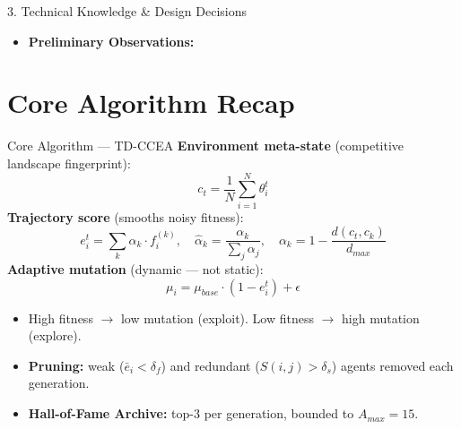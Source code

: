 \documentclass[aspectratio=169, 11pt]{beamer}
\begin{document}
\begin{frame}{3. Technical Knowledge \& Design Decisions}
\begin{itemize}
        \item \textbf{Preliminary Observations:} %
    \end{itemize}
\end{frame}






































\section{Core Algorithm Recap}

\begin{frame}{Core Algorithm --- TD-CCEA}
\small
\textbf{Environment meta-state} (competitive landscape fingerprint):
\[ c_t = \frac{1}{N}\sum_{i=1}^{N} \theta_i^t \]
\textbf{Trajectory score} (smooths noisy fitness):
\[ e_i^t = \sum_k \hat{\alpha}_k \cdot f_i^{(k)},\quad
   \hat{\alpha}_k = \frac{\alpha_k}{\sum_j \alpha_j},\quad
   \alpha_k = 1 - \frac{d(c_t, c_k)}{d_{max}} \]
\textbf{Adaptive mutation} (dynamic --- not static):
\[ \mu_i = \mu_{base}\cdot(1 - e_i^t) + \epsilon \]
\begin{itemize}
    \item High fitness $\rightarrow$ low mutation (exploit). Low fitness $\rightarrow$ high mutation (explore).
    \item \textbf{Pruning:} weak ($\bar{e}_i<\delta_f$) and redundant ($S(i,j)>\delta_s$) agents removed each generation.
    \item \textbf{Hall-of-Fame Archive:} top-3 per generation, bounded to $A_{max}=15$.
\end{itemize}
\end{frame}
\end{document}
